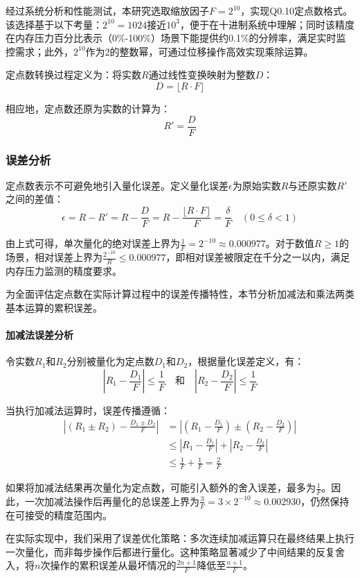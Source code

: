 经过系统分析和性能测试，本研究选取缩放因子$F=2^{10}$，实现Q0.10定点数格式。该选择基于以下考量：$2^{10}=1024$接近$10^3$，便于在十进制系统中理解；同时该精度在内存压力百分比表示（0\%-100\%）场景下能提供约0.1\%的分辨率，满足实时监控需求；此外，$2^{10}$作为2的整数幂，可通过位移操作高效实现乘除运算。

定点数转换过程定义为：将实数$R$通过线性变换映射为整数$D$：
\[
D = \lfloor R \cdot F \rfloor
\]

相应地，定点数还原为实数的计算为：
\[
R' = \frac{D}{F}
\]

\subsubsection{误差分析}

定点数表示不可避免地引入量化误差。定义量化误差$\epsilon$为原始实数$R$与还原实数$R'$之间的差值：
\[
\epsilon = R - R' = R - \frac{D}{F} = R - \frac{\lfloor R \cdot F \rfloor}{F} = \frac{\delta}{F} \quad (0 \leq \delta < 1)
\]

由上式可得，单次量化的绝对误差上界为$\frac{1}{F} = 2^{-10} \approx 0.000977$。对于数值$R \geq 1$的场景，相对误差上界为$\frac{2^{-10}}{R} \leq 0.000977$，即相对误差被限定在千分之一以内，满足内存压力监测的精度要求。

为全面评估定点数在实际计算过程中的误差传播特性，本节分析加减法和乘法两类基本运算的累积误差。

\paragraph{加减法误差分析}\quad 
令实数$R_1$和$R_2$分别被量化为定点数$D_1$和$D_2$，根据量化误差定义，有：
\[
|R_1 - \frac{D_1}{F}| \leq \frac{1}{F} \quad \text{和} \quad |R_2 - \frac{D_2}{F}| \leq \frac{1}{F}
\]

当执行加减法运算时，误差传播遵循：
\[
\begin{aligned}
|(R_1 \pm R_2) - \frac{D_1 \pm D_2}{F}| &= |(R_1 - \frac{D_1}{F}) \pm (R_2 - \frac{D_2}{F})| \\
&\leq |R_1 - \frac{D_1}{F}| + |R_2 - \frac{D_2}{F}| \\
&\leq \frac{1}{F} + \frac{1}{F} = \frac{2}{F}
\end{aligned}
\]

如果将加减法结果再次量化为定点数，可能引入额外的舍入误差，最多为$\frac{1}{F}$。因此，一次加减法操作后再量化的总误差上界为$\frac{3}{F} = 3 \times 2^{-10} \approx 0.002930$，仍然保持在可接受的精度范围内。

在实际实现中，我们采用了误差优化策略：多次连续加减运算只在最终结果上执行一次量化，而非每步操作后都进行量化。这种策略显著减少了中间结果的反复舍入，将$n$次操作的累积误差从最坏情况的$\frac{2n+1}{F}$降低至$\frac{n+1}{F}$。

